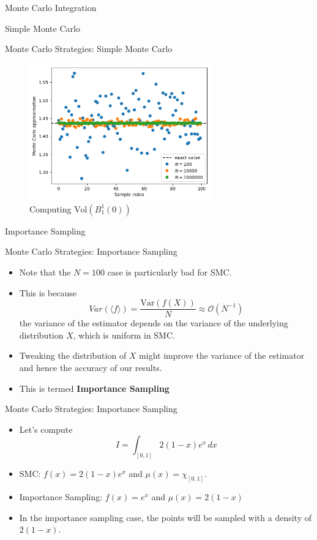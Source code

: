 \documentclass{beamer}
\begin{document}
\begin{section}{Monte Carlo Integration}
\begin{subsection}{Simple Monte Carlo}
\begin{frame}{Monte Carlo Strategies: Simple Monte Carlo}
    \begin{figure}
        \centering
        \includegraphics[width=0.7\textwidth]{output_11_0.png}
        \caption{Computing $\text{Vol}(B^{1}_{1}(0))$}
        \label{fig:SMC}
    \end{figure}
\end{frame}

\end{subsection}

\begin{subsection}{Importance Sampling}
\begin{frame}{Monte Carlo Strategies: Importance Sampling}
    \begin{itemize}
        \item Note that the $N=100$ case is particularly bad for SMC. 
        \pause
        \item This is because 
        $$ Var(\langle f \rangle) = \frac{\text{Var}(f(X))}{N} \approx \mathcal{O}(N^{-1})$$
       the variance of the estimator depends on the variance of the underlying distribution $X$, which is uniform in SMC. \pause
        \item Tweaking the distribution of $X$ might improve the variance of the estimator and hence the accuracy of our results. 
        \pause
        \item This is termed \textbf{Importance Sampling}
    \end{itemize}
\end{frame}

\begin{frame}{Monte Carlo Strategies: Importance Sampling}
\begin{itemize}
    \item Let's compute 
\[ I = \int_{[0,1]}2(1-x)e^x\,dx\]
\pause
\item SMC: $f(x) = 2(1-x)e^x$ and $\mu(x) = \chi_{[0,1]}$.
\pause
\item Importance Sampling: $f(x) = e^x$ and $\mu(x) = 2(1-x)$
\pause
\item In the importance sampling case, the points will be sampled with a density of $2(1-x)$. 
\end{itemize}
\end{frame}


\end{subsection}
\end{section}
\end{document}
